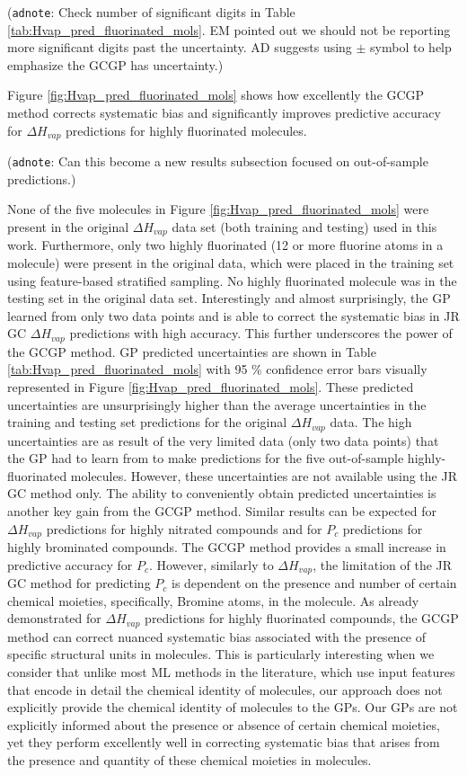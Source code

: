 \documentclass[journal=jacsat,manuscript=article, ]{achemso}
\newcommand{\adnote}[1]{{\color{OliveGreen} (\texttt{adnote}: #1)}}
\begin{document}
\adnote{Check number of significant digits in Table \ref{tab:Hvap_pred_fluorinated_mols}. EM pointed out we should not be reporting more significant digits past the uncertainty. AD suggests using $\pm$ symbol to help emphasize the GCGP has uncertainty.}

Figure \ref{fig:Hvap_pred_fluorinated_mols} shows how excellently the GCGP method corrects systematic bias and significantly improves predictive accuracy for $\Delta H_{vap}$ predictions for highly fluorinated molecules. 

\adnote{Can this become a new results subsection focused on out-of-sample predictions.} 

None of the five molecules in Figure \ref{fig:Hvap_pred_fluorinated_mols} were present in the original $\Delta H_{vap}$ data set (both training and testing) used in this work. 
Furthermore, only two highly fluorinated (12 or more fluorine atoms in a molecule) were present in the original data, which were placed in the training set using feature-based stratified sampling. 
No highly fluorinated molecule was in the testing set in the original data set. Interestingly and almost surprisingly, the GP learned from only two data points and is able to correct the systematic bias in JR GC $\Delta H_{vap}$ predictions with high accuracy. 
This further underscores the power of the GCGP method. GP predicted uncertainties are shown in Table \ref{tab:Hvap_pred_fluorinated_mols} with 95 \% confidence error bars visually represented in Figure \ref{fig:Hvap_pred_fluorinated_mols}. 
These predicted uncertainties are unsurprisingly higher than the average uncertainties in the training and testing set predictions for the original $\Delta H_{vap}$ data. The high uncertainties are as result of the very limited data (only two data points) that the GP had to learn from to make predictions for the five out-of-sample highly-fluorinated molecules.
However, these uncertainties are not available using the JR GC method only. The ability to conveniently obtain predicted uncertainties is another key gain from the GCGP method. 
Similar results can be expected for $\Delta H_{vap}$ predictions for highly nitrated compounds and for $P_c$ predictions for highly brominated compounds. The GCGP method provides a small increase in predictive accuracy for $P_c$. 
However, similarly to $\Delta H_{vap}$, the limitation of the JR GC method for predicting $P_c$ is dependent on the presence and number of certain chemical moieties, specifically, Bromine atoms, in the molecule. As already demonstrated for $\Delta H_{vap}$ predictions for highly fluorinated compounds, the GCGP method can correct nuanced systematic bias associated with the presence of specific structural units in molecules. 
This is particularly interesting when we consider that unlike most ML methods in the literature, which use input features that encode in detail the chemical identity of molecules, our approach does not explicitly provide the chemical identity of molecules to the GPs. 
Our GPs are not explicitly informed about the presence or absence of certain chemical moieties, yet they perform excellently well in correcting systematic bias that arises from the presence and quantity of these chemical moieties in molecules.
\end{document}

